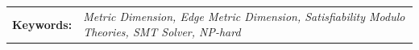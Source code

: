 \vfill

\noindent
\begin{minipage}[t][5cm]{\textwidth}
	\begin{tabularx}{\linewidth}{@{}l@{\enspace}X}
		\textbf{Keywords:} & \textit{Metric Dimension, Edge Metric Dimension, Satisfiability Modulo Theories, SMT Solver, NP-hard}
	\end{tabularx}
\end{minipage}

%

